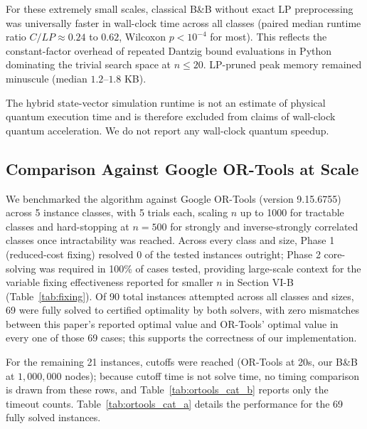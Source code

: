 \documentclass[conference]{IEEEtran} \IEEEoverridecommandlockouts
\begin{document}
For these extremely small scales, classical B\&B without exact LP preprocessing was universally faster in wall-clock time across all classes (paired median runtime ratio $C/LP \approx 0.24$ to $0.62$, Wilcoxon $p < 10^{-4}$ for most). This reflects the constant-factor overhead of repeated Dantzig bound evaluations in Python dominating the trivial search space at $n \le 20$. LP-pruned peak memory remained minuscule (median $1.2\text{--}1.8$ KB). 

The hybrid state-vector simulation runtime is not an estimate of physical quantum execution time and is therefore excluded from claims of wall-clock quantum acceleration. We do not report any wall-clock quantum speedup.

\subsection{Comparison Against Google OR-Tools at Scale}

We benchmarked the algorithm against Google OR-Tools (version 9.15.6755) across 5 instance classes, with 5 trials each, scaling $n$ up to 1000 for tractable classes and hard-stopping at $n=500$ for strongly and inverse-strongly correlated classes once intractability was reached. Across every class and size, Phase 1 (reduced-cost fixing) resolved 0 of the tested instances outright; Phase 2 core-solving was required in 100\% of cases tested, providing large-scale context for the variable fixing effectiveness reported for smaller $n$ in Section VI-B (Table~\ref{tab:fixing}). Of 90 total instances attempted across all classes and sizes, 69 were fully solved to certified optimality by both solvers, with zero mismatches between this paper's reported optimal value and OR-Tools' optimal value in every one of those 69 cases; this supports the correctness of our implementation. 

For the remaining 21 instances, cutoffs were reached (OR-Tools at 20s, our B\&B at $1{,}000{,}000$ nodes); because cutoff time is not solve time, no timing comparison is drawn from these rows, and Table~\ref{tab:ortools_cat_b} reports only the timeout counts. Table~\ref{tab:ortools_cat_a} details the performance for the 69 fully solved instances.
\end{document}
